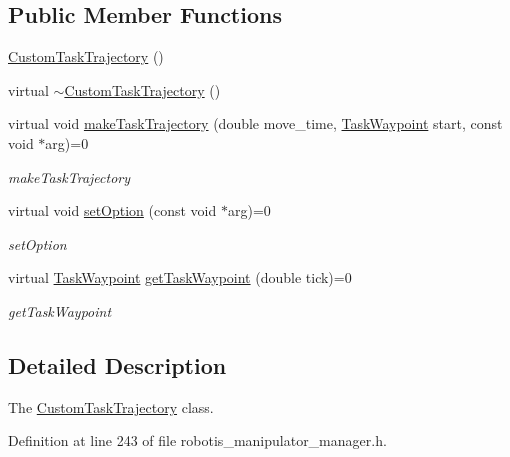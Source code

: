 \subsection*{Public Member Functions}
\begin{DoxyCompactItemize}
\item 
\hyperlink{classrobotis__manipulator_1_1_custom_task_trajectory_ac2d9f3dc73a9b355d967835d5aafc274}{Custom\+Task\+Trajectory} ()
\item 
virtual \hyperlink{classrobotis__manipulator_1_1_custom_task_trajectory_a9895c8d695786bdf868de651d5aa170d}{$\sim$\+Custom\+Task\+Trajectory} ()
\item 
virtual void \hyperlink{classrobotis__manipulator_1_1_custom_task_trajectory_a06278d45f1b80a9994617c61daefac99}{make\+Task\+Trajectory} (double move\+\_\+time, \hyperlink{namespacerobotis__manipulator_a440e2d88ec85fdee394e540dc6024c3e}{Task\+Waypoint} start, const void $\ast$arg)=0
\begin{DoxyCompactList}\small\item\em make\+Task\+Trajectory \end{DoxyCompactList}\item 
virtual void \hyperlink{classrobotis__manipulator_1_1_custom_task_trajectory_a027ae37e3adbdfe634442351240619f1}{set\+Option} (const void $\ast$arg)=0
\begin{DoxyCompactList}\small\item\em set\+Option \end{DoxyCompactList}\item 
virtual \hyperlink{namespacerobotis__manipulator_a440e2d88ec85fdee394e540dc6024c3e}{Task\+Waypoint} \hyperlink{classrobotis__manipulator_1_1_custom_task_trajectory_aa304eee6a768c221750e88faaa3689b8}{get\+Task\+Waypoint} (double tick)=0
\begin{DoxyCompactList}\small\item\em get\+Task\+Waypoint \end{DoxyCompactList}\end{DoxyCompactItemize}


\subsection{Detailed Description}
The \hyperlink{classrobotis__manipulator_1_1_custom_task_trajectory}{Custom\+Task\+Trajectory} class. 

Definition at line 243 of file robotis\+\_\+manipulator\+\_\+manager.\+h.



